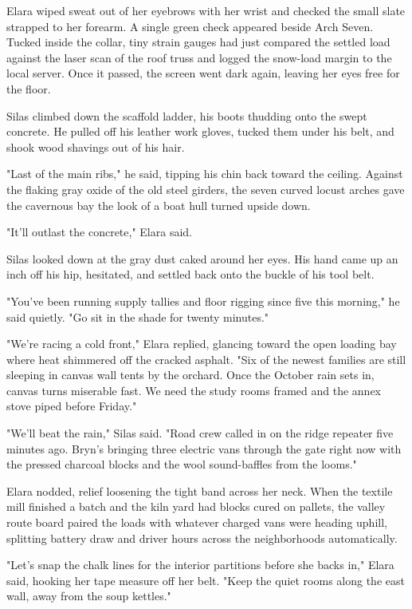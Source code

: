 Elara wiped sweat out of her eyebrows with her wrist and checked the small slate strapped to her forearm. A single green check appeared beside Arch Seven. Tucked inside the collar, tiny strain gauges had just compared the settled load against the laser scan of the roof truss and logged the snow-load margin to the local server. Once it passed, the screen went dark again, leaving her eyes free for the floor.

Silas climbed down the scaffold ladder, his boots thudding onto the swept concrete. He pulled off his leather work gloves, tucked them under his belt, and shook wood shavings out of his hair.

"Last of the main ribs," he said, tipping his chin back toward the ceiling. Against the flaking gray oxide of the old steel girders, the seven curved locust arches gave the cavernous bay the look of a boat hull turned upside down.

"It'll outlast the concrete," Elara said.

Silas looked down at the gray dust caked around her eyes. His hand came up an inch off his hip, hesitated, and settled back onto the buckle of his tool belt.

"You've been running supply tallies and floor rigging since five this morning," he said quietly. "Go sit in the shade for twenty minutes."

"We're racing a cold front," Elara replied, glancing toward the open loading bay where heat shimmered off the cracked asphalt. "Six of the newest families are still sleeping in canvas wall tents by the orchard. Once the October rain sets in, canvas turns miserable fast. We need the study rooms framed and the annex stove piped before Friday."

"We'll beat the rain," Silas said. "Road crew called in on the ridge repeater five minutes ago. Bryn's bringing three electric vans through the gate right now with the pressed charcoal blocks and the wool sound-baffles from the looms."

Elara nodded, relief loosening the tight band across her neck. When the textile mill finished a batch and the kiln yard had blocks cured on pallets, the valley route board paired the loads with whatever charged vans were heading uphill, splitting battery draw and driver hours across the neighborhoods automatically.

"Let's snap the chalk lines for the interior partitions before she backs in," Elara said, hooking her tape measure off her belt. "Keep the quiet rooms along the east wall, away from the soup kettles."


